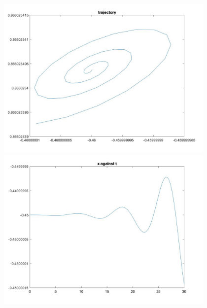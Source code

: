 \documentclass[11pt]{article}
\begin{document}
\begin{figure}[H]
\includegraphics[width = 12cm, height = 8cm]{Q5(24).jpg}
\includegraphics[width = 12cm, height = 8cm]{Q5(25).jpg}
\end{figure}
\end{document}
